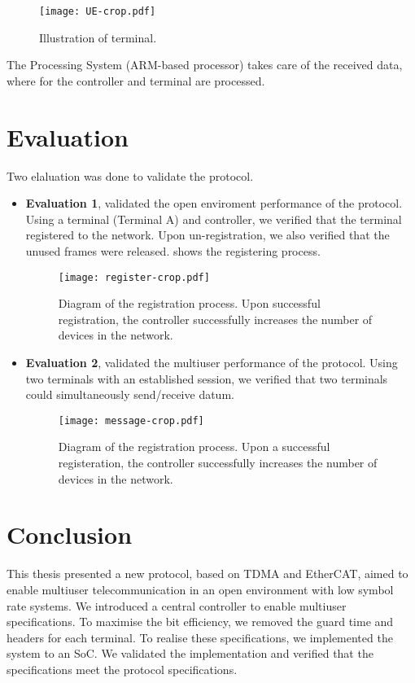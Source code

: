 ﻿\documentclass[twocolumn,9pt]{ltjsarticle}
\renewcommand{\ref}{\Cref}
\begin{document}
\begin{figure}[tb]
  \centering
  \texttt{[image: UE-crop.pdf]}
  \caption{\label{fig:terminal}
    Illustration of terminal.
  }
\end{figure}

The Processing System (ARM\textregistered -based processor) takes care of the received data, where for the controller and terminal are processed.

\section{Evaluation}
Two elaluation was done to validate the protocol.
\begin{itemize}
\item \textbf{Evaluation 1}, validated the open enviroment performance of the protocol.
  Using a terminal (Terminal A) and controller, we verified that the terminal registered to the network.
  Upon un-registration, we also verified that the unused frames were released.
  \ref{fig:register} shows the registering process.
  \begin{figure}[tb]
    \centering
    \texttt{[image: register-crop.pdf]}
    \caption{\label{fig:register}
      Diagram of the registration process.
      Upon successful registration, the controller successfully increases the number of devices in the network.
    }
  \end{figure}
\item \textbf{Evaluation 2}, validated the multiuser performance of the protocol.
  Using two terminals with an established session, we verified that two terminals could simultaneously send/receive datum.
    \begin{figure}[tb]
    \centering
    \texttt{[image: message-crop.pdf]}
    \caption{\label{fig:register}
      Diagram of the registration process.
      Upon a successful registeration, the controller successfully increases the number of devices in the network.
    }
  \end{figure}    
\end{itemize}

\section{Conclusion}
This thesis presented a new protocol, based on TDMA and EtherCAT, aimed to enable multiuser telecommunication in an open environment with low symbol rate systems.
We introduced a central controller to enable multiuser specifications.
To maximise the bit efficiency, we removed the guard time and headers for each terminal.
To realise these specifications, we implemented the system to an SoC.
We validated the implementation and verified that the specifications meet the protocol specifications.
\end{document}
